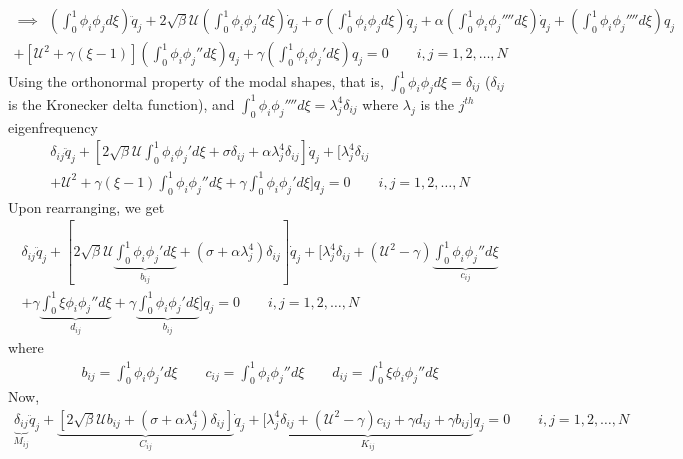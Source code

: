 \documentclass[12pt]{report}
\begin{document}
\begin{multline*}
\implies~~\left(\int_0^1\phi_i \phi_j d\xi\right) \ddot{q}_j+ 2\sqrt{\beta}\mathcal{U} \left(\int_0^1 \phi_i \phi_j' d\xi\right) \dot{q}_j + \sigma \left(\int_0^1 \phi_i\phi_j  d\xi\right)\dot{q}_j +  \alpha  \left( \int_0^1 \phi_i \phi_j''''d\xi\right) \dot{q}_j  +  \left(\int_0^1\phi_i \phi_j''''  d\xi\right)q_j \\
+  \left[\mathcal{U}^2 + \gamma (\xi - 1)\right] \left( \int_0^1 \phi_i\phi_j''   d\xi\right)q_j   + \gamma \left(\int_0^1 \phi_i\phi_j'd\xi\right)q_j = 0 \qquad i,j = 1,2, \dots, N
\end{multline*}
Using the orthonormal property of the modal shapes, that is, $\int_0^1\phi_i \phi_j d\xi = \delta_{ij}$ ($\delta_{ij}$ is the Kronecker delta function), and $\int_0^1\phi_i \phi_j'''' d\xi = \lambda_j^4\delta_{ij}$ where $\lambda_j$ is the $j^{th}$ eigenfrequency
\begin{multline*}
\delta_{ij} \ddot{q}_j+ \left[2\sqrt{\beta}\mathcal{U} \int_0^1 \phi_i \phi_j' d\xi  + \sigma \delta_{ij} +  \alpha  \lambda_j^4\delta_{ij} \right]\dot{q}_j  + \bigg[\lambda_j^4\delta_{ij}  \\
+  \mathcal{U}^2 + \gamma (\xi - 1) \int_0^1 \phi_i\phi_j''   d\xi   + \gamma \int_0^1 \phi_i\phi_j'd\xi\bigg]q_j = 0 \qquad i,j = 1,2, \dots, N
\end{multline*}
Upon rearranging, we get
\begin{multline*}
\delta_{ij} \ddot{q}_j + \left[2\sqrt{\beta}\mathcal{U} \underbrace{\int_0^1 \phi_i \phi_j' d\xi}_{b_{ij}}  + (\sigma +  \alpha  \lambda_j^4) \delta_{ij} \right]\dot{q}_j  + \bigg[\lambda_j^4\delta_{ij} +  (\mathcal{U}^2 - \gamma)\underbrace{\int_0^1 \phi_i\phi_j'' d\xi}_{c_{ij}}  \\ + \gamma \underbrace{\int_0^1 \xi\phi_i\phi_j'' d\xi}_{d_{ij}}  + \gamma \underbrace{\int_0^1 \phi_i\phi_j'd\xi}_{b_{ij}}\bigg]q_j = 0 \qquad i,j = 1,2, \dots, N
\end{multline*}
where
\begin{align*}
   b_{ij} = \int_0^1 \phi_i \phi_j' d\xi \qquad c_{ij} = \int_0^1 \phi_i\phi_j'' d\xi \qquad d_{ij} = \int_0^1 \xi\phi_i\phi_j'' d\xi
\end{align*}
Now,
\begin{multline}
\underbrace{\delta_{ij}}_{M_{ij}} \ddot{q}_j + \underbrace{\left[2\sqrt{\beta}\mathcal{U} b_{ij}  + (\sigma +  \alpha  \lambda_j^4) \delta_{ij} \right]}_{C_{ij}}\dot{q}_j  + \underbrace{\bigg[\lambda_j^4\delta_{ij} +  (\mathcal{U}^2 - \gamma)c_{ij} + \gamma d_{ij}  + \gamma b_{ij}\bigg]}_{K_{ij}}q_j = 0 \qquad i,j = 1,2, \dots, N    \label{eqn:modal-equation}
\end{multline}
\end{document}

